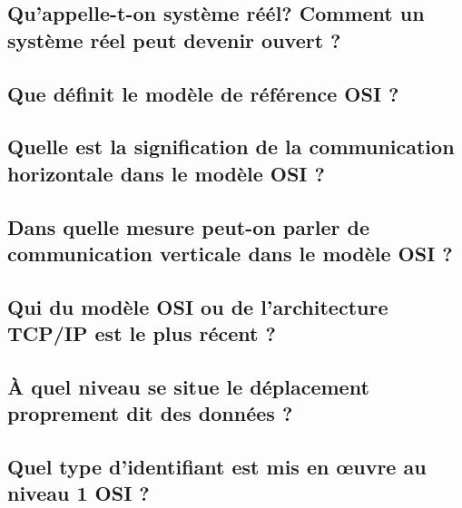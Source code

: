 \documentclass[12pt,a4paper,openany]{book}
\begin{document}
	\subsection{Qu'appelle-t-on système réél? Comment un système réel peut devenir ouvert ?}
	\subsection{Que définit le modèle de référence OSI ?}
	\subsection{Quelle est la signification de la communication horizontale dans le modèle OSI ?}
	\subsection{Dans quelle mesure peut-on parler de communication verticale dans le modèle OSI ?}
	\subsection{Qui du modèle OSI ou de l'architecture TCP/IP est le plus récent ?}
	\subsection{À quel niveau se situe le déplacement proprement dit des données ?}
	\subsection{Quel type d'identifiant est mis en \oe{}uvre au niveau 1 OSI ?}
\end{document}

